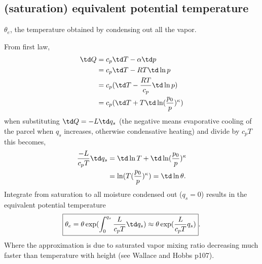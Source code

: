 \subsection{(saturation) equivalent potential temperature}
\begin{defn*} $\theta_e$, the temperature obtained by condensing out all the vapor. \\
\end{defn*}

\begin{derv*} 
From first law, 
\begin{equation}
\begin{aligned}
   \td Q & = c_p \td T - \alpha \td p \\ 
         & = c_p \td T - RT \td \ln p \\
         & = c_p( \td T - \frac{RT}{c_p} \td \ln p) \\
         & = c_p( \td T + T \td \ln(\frac{p_0}{p})^\kappa) 
\end{aligned}
\end{equation}
when substituting $\td Q = -L\td q_{s}$ (the negative means evaporative cooling of the parcel when
$q_{s}$ increases, otherwise condensative heating) and divide by $c_p T$ this becomes, 
\begin{equation} \label{eq:saturationCooling}
\begin{aligned}
   \frac{-L}{c_pT} \td q_{s} & = \td \ln T + \td \ln(\frac{p_0}{p})^\kappa \\
          & = \ln (T(\frac{p_0}{p})^\kappa) = \td \ln \theta.
\end{aligned}
\end{equation}
Integrate from saturation to all moisture condensed out ($q_{s}=0$) results in the equivalent potential
temperature
\begin{equation}
\begin{aligned}
   \boxed{\theta_e = \theta\exp(\int_0^{q_{s}} \frac{L}{c_pT} \td q_{s}) 
         \approx \theta\exp(\frac{L}{c_pT} q_{s})}.
\end{aligned}
\end{equation}
Where the approximation is due to saturated vapor mixing ratio decreasing much faster than
temperature with height (see Wallace and Hobbs p107). 
\end{derv*}

